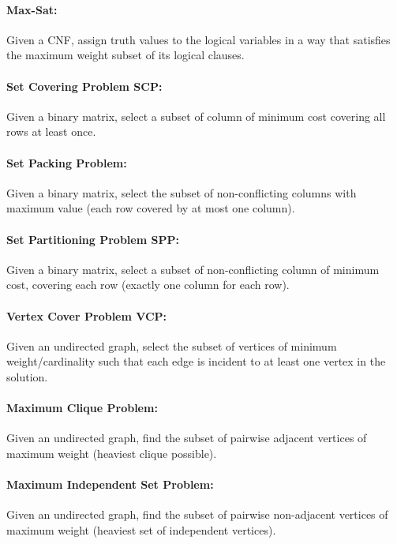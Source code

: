\documentclass{article}
\begin{document}
	\paragraph{Max-Sat:} Given a CNF, assign truth values to the logical variables in a way that satisfies the maximum weight subset of its logical clauses.\\
	
	\paragraph{Set Covering Problem SCP:} Given a binary matrix, select a subset of column of minimum cost covering all rows at least once.\\
	
	\paragraph{Set Packing Problem:} Given a binary matrix, select the subset of non-conflicting columns with maximum value (each row covered by at most one column).\\
	
	\paragraph{Set Partitioning Problem SPP:} Given a binary matrix, select a subset of non-conflicting column of minimum cost, covering each row (exactly one column for each row).\\
	
	\paragraph{Vertex Cover Problem VCP:} Given an undirected graph, select the subset of vertices of minimum weight/cardinality such that each edge is incident to at least one vertex in the solution.\\
	
	\paragraph{Maximum Clique Problem:} Given an undirected graph, find the subset of pairwise adjacent vertices of maximum weight (heaviest clique possible). \\
	
	\paragraph{Maximum Independent Set Problem:} Given an undirected graph, find the subset of pairwise non-adjacent vertices of maximum weight (heaviest set of independent vertices).\\
	
\end{document}
